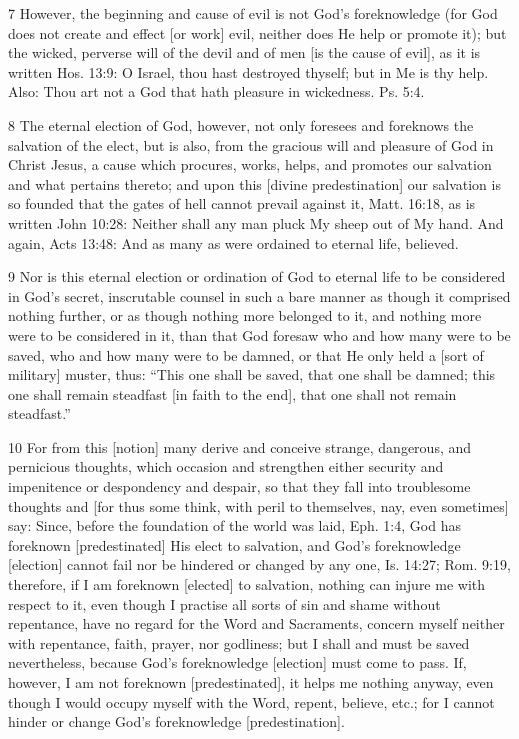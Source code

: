 {7 However, the beginning and cause of evil is not God’s foreknowledge (for God does not create and effect [or work] evil, neither does He help or promote it); but the wicked, perverse will of the devil and of men [is the cause of evil], as it is written Hos. 13:9: O Israel, thou hast destroyed thyself; but in Me is thy help. Also: Thou art not a God that hath pleasure in wickedness. Ps. 5:4.

8 The eternal election of God, however, not only foresees and foreknows the salvation of the elect, but is also, from the gracious will and pleasure of God in Christ Jesus, a cause which procures, works, helps, and promotes our salvation and what pertains thereto; and upon this [divine predestination] our salvation is so founded that the gates of hell cannot prevail against it, Matt. 16:18, as is written John 10:28: Neither shall any man pluck My sheep out of My hand. And again, Acts 13:48: And as many as were ordained to eternal life, believed.

9 Nor is this eternal election or ordination of God to eternal life to be considered in God’s secret, inscrutable counsel in such a bare manner as though it comprised nothing further, or as though nothing more belonged to it, and nothing more were to be considered in it, than that God foresaw who and how many were to be saved, who and how many were to be damned, or that He only held a [sort of military] muster, thus: “This one shall be saved, that one shall be damned; this one shall remain steadfast [in faith to the end], that one shall not remain steadfast.”

10 For from this [notion] many derive and conceive strange, dangerous, and pernicious thoughts, which occasion and strengthen either security and impenitence or despondency and despair, so that they fall into troublesome thoughts and [for thus some think, with peril to themselves, nay, even sometimes] say: Since, before the foundation of the world was laid, Eph. 1:4, God has foreknown [predestinated] His elect to salvation, and God’s foreknowledge [election] cannot fail nor be hindered or changed by any one, Is. 14:27; Rom. 9:19, therefore, if I am foreknown [elected] to salvation, nothing can injure me with respect to it, even though I practise all sorts of sin and shame without repentance, have no regard for the Word and Sacraments, concern myself neither with repentance, faith, prayer, nor godliness; but I shall and must be saved nevertheless, because God’s foreknowledge [election] must come to pass. If, however, I am not foreknown [predestinated], it helps me nothing anyway, even though I would occupy myself with the Word, repent, believe, etc.; for I cannot hinder or change God’s foreknowledge [predestination].

}
